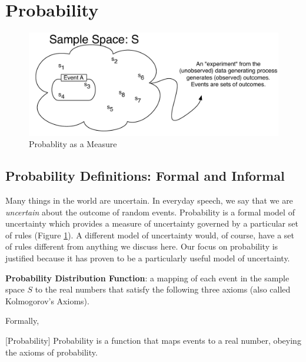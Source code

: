 \documentclass[]{book}
\theoremstyle{definition}
\theoremstyle{definition}
\theoremstyle{definition}
\theoremstyle{remark}
\begin{document}
\hypertarget{probdef}{%
\section{Probability}\label{probdef}}

\begin{figure}
\centering
\includegraphics{images/probability.pdf}
\caption[\label{fig:prob-image}Probablity as a Measure]{\label{fig:prob-image}Probablity as a Measure\footnotemark{}}
\end{figure}

\hypertarget{probability-definitions-formal-and-informal}{%
\subsection*{Probability Definitions: Formal and Informal}\label{probability-definitions-formal-and-informal}}

Many things in the world are uncertain. In everyday speech, we say that we are \emph{uncertain} about the outcome of random events. Probability is a formal model of uncertainty which provides a measure of uncertainty governed by a particular set of rules (Figure \ref{fig:prob-image}). A different model of uncertainty would, of course, have a set of rules different from anything we discuss here. Our focus on probability is justified because it has proven to be a particularly useful model of uncertainty.

\textbf{Probability Distribution Function}: a mapping of each event in the sample space \(S\) to the real numbers that satisfy the following three axioms (also called Kolmogorov's Axioms).

Formally,

[Probability]
\protect\hypertarget{def:unnamed-chunk-66}{}{\label{def:unnamed-chunk-66} {} }
Probability is a function that maps events to a real number, obeying the axioms of probability.
\end{document}
